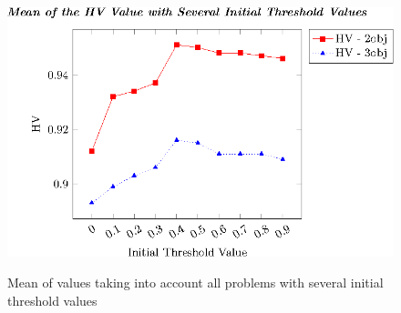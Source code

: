 \begin{figure}[t]
\centering
\includegraphics[scale=0.85]{Images/Graphic-Initial-Distance_tikz-figure0.eps} \\
%
\caption{Mean of \HV{} values taking into account all problems with several initial threshold values}\label{fig:Initial-distance-factor}
\end{figure}



%
%
%
%
